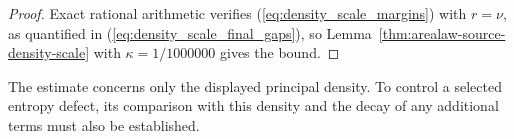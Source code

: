 \begin{proof}
    \leanok
    Exact rational arithmetic verifies (\ref{eq:density_scale_margins})
    with $r=\nu$, as quantified in (\ref{eq:density_scale_final_gaps}),
    so Lemma~\ref{thm:arealaw-source-density-scale} with
    $\kappa=1/1000000$ gives the bound.
\end{proof}

The estimate concerns only the displayed principal density. To control
a selected entropy defect, its comparison with this density and
the decay of any additional terms must also be established.
